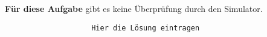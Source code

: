\begin{questions}
\begin{parts}
                \textbf{Für diese Aufgabe} gibt es keine Überprüfung durch den Simulator.
                \begin{solution}
                   \begin{lstlisting}
                    Hier die Lösung eintragen
                   \end{lstlisting}

                \end{solution}
        \end{parts}
\end{questions}

